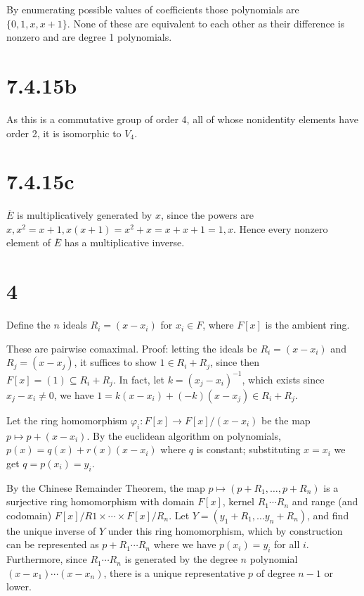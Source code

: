 \documentclass{article}
\def\inv{{-1}}
\def\vphi{\varphi}
\begin{document}
By enumerating possible values of coefficients those polynomials are $\{0, 1, x, x+1\}$. None of these are equivalent to each other as their difference is nonzero and are degree 1 polynomials.

\section*{7.4.15b}

As this is a commutative group of order 4, all of whose nonidentity elements have order 2, it is isomorphic to $V_4$.

\section*{7.4.15c}

$\overline{E}$ is multiplicatively generated by $x$, since the powers are $x, x^2 = x+1, x(x+1) = x^2 + x = x + x + 1 = 1, x$. Hence every nonzero element of $\overline{E}$ has a multiplicative inverse.

\section*{4}

Define the $n$ ideals $R_i = (x-x_i)$ for $x_i \in F$, where $F[x]$ is the ambient ring.

These are pairwise comaximal. Proof: letting the ideals be $R_i = (x-x_i)$ and $R_j = (x-x_j)$, it suffices to show $1 \in R_i + R_j$, since then $F[x] = (1) \subseteq R_i + R_j$. In fact, let $k = (x_j-x_i)^\inv$, which exists since $x_j - x_i \ne 0$, we have $1 = k(x-x_i) + (-k)(x-x_j) \in R_i + R_j$.

Let the ring homomorphism $\vphi_i : F[x] \to F[x]/(x-x_i)$ be the map $p \mapsto p + (x - x_i)$. By the euclidean algorithm on polynomials, $p(x) = q(x) + r(x)(x - x_i)$ where $q$ is constant; substituting $x = x_i$ we get $q = p(x_i) = y_i$.

By the Chinese Remainder Theorem, the map $p \mapsto (p+R_1, \ldots, p+R_n)$ is a surjective ring homomorphism with domain $F[x]$, kernel $R_1 \cdots R_n$ and range (and codomain) $F[x]/R1 \times \cdots \times F[x]/R_n$. Let $Y = (y_1 + R_1, \ldots y_n + R_n)$, and find the unique inverse of $Y$ under this ring homomorphism, which by construction can be represented as $p + R_1 \cdots R_n$ where we have $p(x_i) = y_i$ for all $i$. Furthermore, since $R_1 \cdots R_n$ is generated by the degree $n$ polynomial $(x-x_1) \cdots (x-x_n)$, there is a unique representative $p$ of degree $n-1$ or lower.
\end{document}

